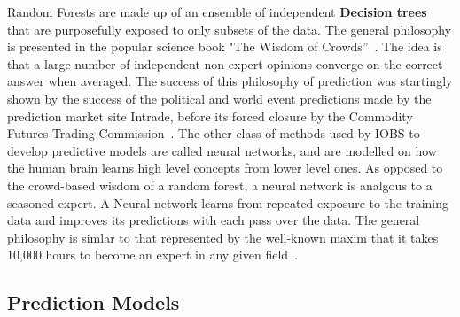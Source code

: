 \documentclass[10pt,letterpaper]{article}
\begin{document}
Random Forests are made up of an ensemble of independent \textbf{Decision trees} that are purposefully exposed to only subsets of the data. The general philosophy is presented in the popular science book "The Wisdom of Crowds''~\cite{wisdom}.
The idea is that a large number of independent non-expert opinions converge on the correct answer when averaged. The success of this philosophy of prediction was startingly shown by the success of the political and world event predictions made by the prediction market site Intrade, before its forced closure by the Commodity Futures Trading Commission~\cite{cassidy}. %
 The other class of methods used by IOBS to develop predictive models are called neural networks, and are modelled on how the human brain learns high level concepts from lower level ones. 
As opposed to the crowd-based wisdom of a random forest, a neural network is analgous to a seasoned expert. 
A Neural network learns from repeated exposure to the training data and improves its predictions with each pass over the data.
 The general philosophy is simlar to that represented by the well-known maxim that it takes 10,000 hours to become an expert in any given field~\cite{outliers}.


\subsection*{Prediction Models}
\label{sec:predmodels}
\end{document}
